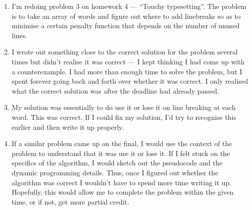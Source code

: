 \documentclass[12 pt, letterpaper]{hmcpset}
\begin{document}
\begin{solution}
	\begin{enumerate}
		\item I'm redoing problem 3 on homework 4 --- ``Touchy typesetting''. The problem is to take an array of words and figure out where to add linebreaks so as to minimise a certain penalty function that depends on the number of unused lines.

		\item I wrote out something close to the correct solution for the problem several times but didn't realise it was correct --- I kept thinking I had come up with a counterexample. I had more than enough time to solve the problem, but I spent forever going back and forth over whether it was correct. I only realised what the correct solution was after the deadline had already passed.

		\item My solution was essentially to do use it or lose it on line breaking at each word. This was correct. If I could fix my solution, I'd try to recognise this earlier and then write it up properly.

		\item If a similar problem came up on the final, I would use the context of the problem to understand that it was use it or lose it. If I felt stuck on the specifics of the algorithm, I would sketch out the pseudocode and the dynamic programming details. Thus, once I figured out whether the algorithm was correct I wouldn't have to spend more time writing it up. Hopefully, this would allow me to complete the problem within the given time, or if not, get more partial credit.
	\end{enumerate}
\end{solution}
\end{document}
